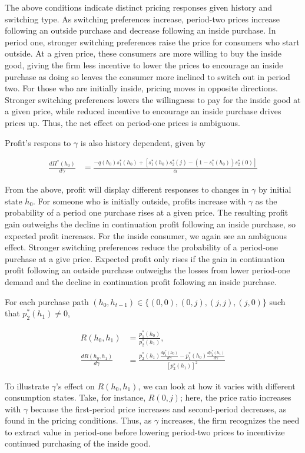 \documentclass[12pt]{article}
\theoremstyle{definition}
\theoremstyle{remark}
\begin{document}
The above conditions indicate distinct pricing responses given history and switching type. As switching preferences increase, period-two prices increase following an outside purchase and decrease following an inside purchase. In period one, stronger switching preferences raise the price for consumers who start outside. At a given price, these consumers are more willing to buy the inside good, giving the firm less incentive to lower the prices to encourage an inside purchase as doing so leaves the consumer more inclined to switch out in period two. For those who are initially inside, pricing moves in opposite directions. Stronger switching preferences lowers the willingness to pay for the inside good at a given price, while reduced incentive to encourage an inside purchase drives prices up. Thus, the net effect on period-one prices is ambiguous.

Profit's respons to $\gamma$ is also history dependent, given by

\begin{align}
  \frac{d\Pi^*(h_0)}{d\gamma} &= \frac{-q(h_0)s_1^*(h_0) + [s_1^*(h_0)s_2^*(j) - (1-s_1^*(h_0))s_2^*(0)]}{\alpha}
\end{align}

From the above, profit will display different responses to changes in $\gamma$ by initial state $h_0$. For someone who is initially outside, profits increase with $\gamma$ as the probability of a period one purchase rises at a given price. The resulting profit gain outweighs the decline in continuation profit following an inside purchase, so expected profit increases. For the inside consumer, we again see an ambiguous effect. Stronger switching preferences reduce the probability of a period-one purchase at a give price. Expected profit only rises if the gain in continuation profit following an outside purchase outweighs the losses from lower period-one demand and the decline in continuation profit following an inside purchase.

For each purchase path $(h_0,h_{t-1})\in\{(0,0),(0,j),(j,j),(j,0)\}$ such that $p_2^*(h_1)\ne0$,

\begin{align}
 R(h_0,h_1)&=\frac{p_1^*(h_0)}{p_2^*(h_1)},\\
 \frac{dR(h_0,h_1)}{d\gamma} &=\frac{p_2^*(h_1)\frac{dp_1^*(h_0)}{d\gamma}-p_1^*(h_0)\frac{dp_2^*(h_1)}{d\gamma}}{[p_2^*(h_1)]^2}
\end{align}

To illustrate $\gamma$'s effect on $R(h_0, h_1)$, we can look at how it varies with different consumption states. Take, for instance, $R(0,j)$; here, the price ratio increases with $\gamma$ because the first-period price increases and second-period decreases, as found in the pricing conditions. Thus, as $\gamma$ increases, the firm recognizes the need to extract value in period-one before lowering period-two prices to incentivize continued purchasing of the inside good. 
\end{document}
